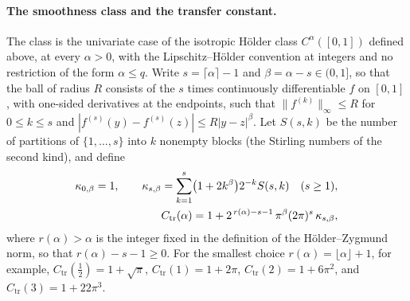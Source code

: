 \paragraph*{The smoothness class and the transfer constant.}
The class is the univariate case of the isotropic H\"older class $C^\alpha([0,1])$ defined above, at every $\alpha>0$, with the Lipschitz--H\"older convention at integers and no restriction of the form $\alpha\leq q$. Write $s=\lceil\alpha\rceil-1$ and $\beta=\alpha-s\in(0,1]$, so that the ball of radius $R$ consists of the $s$ times continuously differentiable $f$ on $[0,1]$, with one-sided derivatives at the endpoints, such that $\|f^{(k)}\|_\infty\leq R$ for $0\leq k\leq s$ and $|f^{(s)}(y)-f^{(s)}(z)|\leq R|y-z|^\beta$. Let $S(s,k)$ be the number of partitions of $\{1,\ldots,s\}$ into $k$ nonempty blocks (the Stirling numbers of the second kind), and define
\begin{align}
\kappa_{0,\beta}=1,
\qquad
\kappa_{s,\beta}=\sum_{k=1}^s\bigl(1+2k^\beta\bigr)2^{-k}S(s,k)\quad(s\geq1),
\notag\\
C_{\mathrm{tr}}(\alpha)=1+2^{\,r(\alpha)-s-1}\,\pi^\beta(2\pi)^s\,\kappa_{s,\beta},
\label{eq:cheb-Ctr}
\end{align}
where $r(\alpha)>\alpha$ is the integer fixed in the definition of the H\"older--Zygmund norm, so that $r(\alpha)-s-1\geq0$. For the smallest choice $r(\alpha)=\lfloor\alpha\rfloor+1$, for example, $C_{\mathrm{tr}}(\tfrac12)=1+\sqrt\pi$, $C_{\mathrm{tr}}(1)=1+2\pi$, $C_{\mathrm{tr}}(2)=1+6\pi^2$, and $C_{\mathrm{tr}}(3)=1+22\pi^3$.

